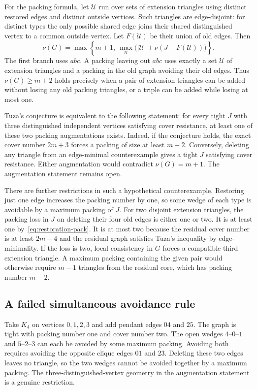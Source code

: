 \documentclass[11pt]{article}
\begin{document}
For the packing formula, let $\mathcal U$ run over sets of extension triangles using distinct restored edges and distinct outside vertices. Such triangles are edge-disjoint: for distinct types the only possible shared edge joins their shared distinguished vertex to a common outside vertex. Let $F(\mathcal U)$ be their union of old edges. Then
\begin{equation}\label{eq:restoration-pack}
 \nu(G)=\max\left\{m+1,\ \max_{\mathcal U}
 \bigl(|\mathcal U|+\nu(J-F(\mathcal U))\bigr)\right\}.
\end{equation}
The first branch uses $abc$. A packing leaving out $abc$ uses exactly a set $\mathcal U$ of extension triangles and a packing in the old graph avoiding their old edges. Thus $\nu(G)\ge m+2$ holds precisely when a pair of extension triangles can be added without losing any old packing triangles, or a triple can be added while losing at most one.

Tuza's conjecture is equivalent to the following statement: for every tight $J$ with three distinguished independent vertices satisfying cover resistance, at least one of these two packing augmentations exists. Indeed, if the conjecture holds, the exact cover number $2m+3$ forces a packing of size at least $m+2$. Conversely, deleting any triangle from an edge-minimal counterexample gives a tight $J$ satisfying cover resistance. Either augmentation would contradict $\nu(G)=m+1$. The augmentation statement remains open.

There are further restrictions in such a hypothetical counterexample. Restoring just one edge increases the packing number by one, so some wedge of each type is avoidable by a maximum packing of $J$. For two disjoint extension triangles, the packing loss in $J$ on deleting their four old edges is either one or two. It is at least one by~\eqref{eq:restoration-pack}. It is at most two because the residual cover number is at least $2m-4$ and the residual graph satisfies Tuza's inequality by edge-minimality. If the loss is two, local consistency in $G$ forces a compatible third extension triangle. A maximum packing containing the given pair would otherwise require $m-1$ triangles from the residual core, which has packing number $m-2$.

\subsection{A failed simultaneous avoidance rule}

Take $K_4$ on vertices $0,1,2,3$ and add pendant edges $04$ and $25$. The graph is tight with packing number one and cover number two. The open wedges $4$--$0$--$1$ and $5$--$2$--$3$ can each be avoided by some maximum packing. Avoiding both requires avoiding the opposite clique edges $01$ and $23$. Deleting these two edges leaves no triangle, so the two wedges cannot be avoided together by a maximum packing. The three-distinguished-vertex geometry in the augmentation statement is a genuine restriction.
\end{document}
